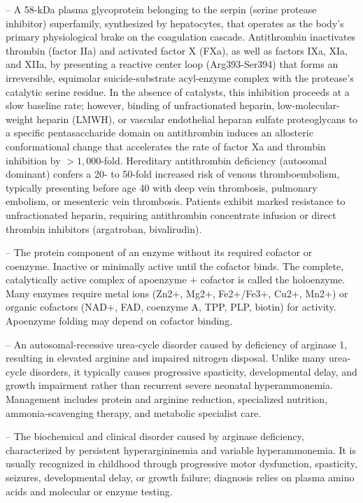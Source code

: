 -- A 58-kDa plasma glycoprotein belonging to the serpin (serine protease inhibitor) superfamily, synthesized by hepatocytes, that operates as the body's primary physiological brake on the coagulation cascade. Antithrombin inactivates thrombin (factor IIa) and activated factor X (FXa), as well as factors IXa, XIa, and XIIa, by presenting a reactive center loop (Arg393-Ser394) that forms an irreversible, equimolar suicide-substrate acyl-enzyme complex with the protease's catalytic serine residue. In the absence of catalysts, this inhibition proceeds at a slow baseline rate; however, binding of unfractionated heparin, low-molecular-weight heparin (LMWH), or vascular endothelial heparan sulfate proteoglycans to a specific pentasaccharide domain on antithrombin induces an allosteric conformational change that accelerates the rate of factor Xa and thrombin inhibition by $>1,000$-fold. Hereditary antithrombin deficiency (autosomal dominant) confers a 20- to 50-fold increased risk of venous thromboembolism, typically presenting before age 40 with deep vein thrombosis, pulmonary embolism, or mesenteric vein thrombosis. Patients exhibit marked resistance to unfractionated heparin, requiring antithrombin concentrate infusion or direct thrombin inhibitors (argatroban, bivalirudin).

-- The protein component of an enzyme without its required cofactor or coenzyme. Inactive or minimally active until the cofactor binds. The complete, catalytically active complex of apoenzyme + cofactor is called the holoenzyme. Many enzymes require metal ions (Zn2+, Mg2+, Fe2+/Fe3+, Cu2+, Mn2+) or organic cofactors (NAD+, FAD, coenzyme A, TPP, PLP, biotin) for activity. Apoenzyme folding may depend on cofactor binding.

-- An autosomal-recessive urea-cycle disorder caused by deficiency of arginase 1, resulting in elevated arginine and impaired nitrogen disposal. Unlike many urea-cycle disorders, it typically causes progressive spasticity, developmental delay, and growth impairment rather than recurrent severe neonatal hyperammonemia. Management includes protein and arginine reduction, specialized nutrition, ammonia-scavenging therapy, and metabolic specialist care.

-- The biochemical and clinical disorder caused by arginase deficiency, characterized by persistent hyperargininemia and variable hyperammonemia. It is usually recognized in childhood through progressive motor dysfunction, spasticity, seizures, developmental delay, or growth failure; diagnosis relies on plasma amino acids and molecular or enzyme testing.

